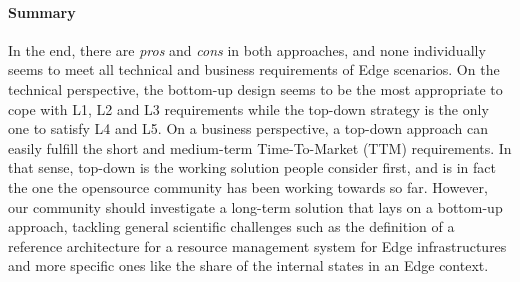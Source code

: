 \paragraph{Summary}
In the end, there are \emph{pros} and \emph{cons} in both approaches,
and none individually seems to meet all technical and business
requirements of Edge scenarios.
On the technical perspective, the bottom-up
design seems to be the most appropriate to cope with L1, L2 and L3
requirements while the top-down strategy is the only one to satisfy L4
and L5.
%
On a business perspective, a top-down approach can easily fulfill the
short and medium-term Time-To-Market (TTM) requirements. In that
sense, top-down is the working solution people consider first, and is
in fact the one the opensource community has been working towards so
far. However, our community should investigate a long-term solution
that lays on a bottom-up approach, tackling general scientific
challenges such as the definition of a reference architecture for a
resource management system for Edge infrastructures and more specific
ones like the share of the internal states in an Edge context.










